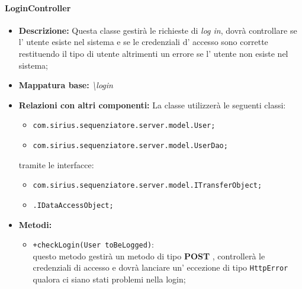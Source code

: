 \paragraph{LoginController}%
\begin{itemize}
	\item \textbf{Descrizione: }Questa classe gestirà le richieste di \textit{log in}, dovrà controllare se l' utente esiste nel sistema e se le credenziali d' accesso sono corrette restituendo il tipo di utente altrimenti un errore se l' utente non esiste nel sistema;
	\item \textbf{Mappatura base: }\textit{\textbackslash login}
	\item \textbf{Relazioni con altri componenti: }
	La classe utilizzerà le seguenti classi:
	\begin{itemize}
		\item \texttt{com.sirius.sequenziatore.server.model.User;}
		\item \texttt{com.sirius.sequenziatore.server.model.UserDao;}
	\end{itemize}
	tramite le interfacce:
	\begin{itemize}
		\item \texttt{com.sirius.sequenziatore.server.model.ITransferObject;}
		\item \texttt{\sModel .IDataAccessObject;}
	\end{itemize}
	\item \textbf{Metodi: }\begin{itemize}
					\item \texttt{+checkLogin(User toBeLogged)}:\\
					 questo metodo gestirà un metodo di tipo \textbf{POST} , controllerà le credenziali di accesso e dovrà lanciare un' eccezione di tipo \texttt{HttpError} qualora ci siano stati problemi nella login;
				\end{itemize}
\end{itemize}
